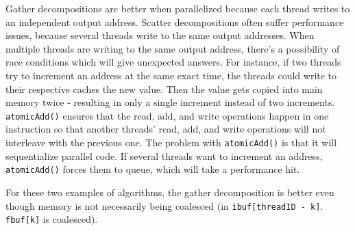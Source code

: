 Gather decompositions are better when parallelized because each thread writes to an independent output address. Scatter decompositions often suffer performance issues, because several threads write to the same output addresses. When multiple threads are writing to the same output address, there's a possibility of race conditions which will give unexpected answers. For instance, if two threads try to increment an address at the same exact time, the threads could write to their respective caches the new value. Then the value gets copied into main memory twice - resulting in only a single increment instead of two increments. \verb|atomicAdd()| ensures that the read, add, and write operations happen in one instruction so that another threads' read, add, and write operations will not interleave with the previous one. The problem with \verb|atomicAdd()| is that it will sequentialize parallel code. If several threads want to increment an address, \verb|atomicAdd()| forces them to queue, which will take a performance hit. 

For these two examples of algorithms, the gather decomposition is better even though memory is not necessarily being coalesced (in \verb|ibuf[threadID - k]|. \verb|fbuf[k]| is coalesced).